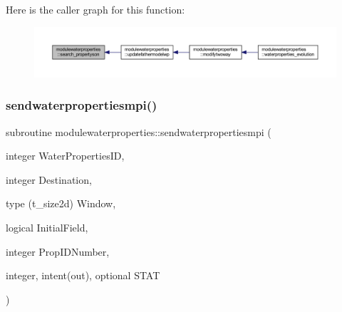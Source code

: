 Here is the caller graph for this function\+:\nopagebreak
\begin{figure}[H]
\begin{center}
\leavevmode
\includegraphics[width=350pt]{namespacemodulewaterproperties_afdb62b42fe2bd1edafce470c06060ee4_icgraph}
\end{center}
\end{figure}
\mbox{\label{namespacemodulewaterproperties_a06e60ba3cd186c1e0cc2c534f1148b41}} 
\subsubsection{\texorpdfstring{sendwaterpropertiesmpi()}{sendwaterpropertiesmpi()}}
{\footnotesize\ttfamily subroutine modulewaterproperties\+::sendwaterpropertiesmpi (\begin{DoxyParamCaption}\item[{integer}]{Water\+Properties\+ID,  }\item[{integer}]{Destination,  }\item[{type (t\+\_\+size2d)}]{Window,  }\item[{logical}]{Initial\+Field,  }\item[{integer}]{Prop\+I\+D\+Number,  }\item[{integer, intent(out), optional}]{S\+T\+AT }\end{DoxyParamCaption})\hspace{0.3cm}{\ttfamily [private]}}

